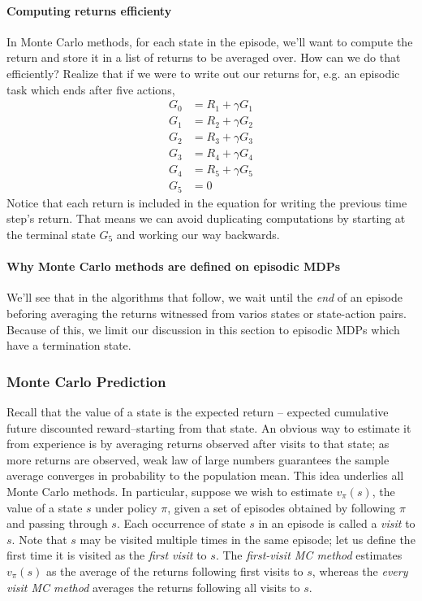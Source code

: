 \documentclass[12pt]{article}
\begin{document}
\paragraph{Computing returns efficienty} In Monte Carlo methods, for each state in the episode, we'll want to compute the return and store it in a list of returns to be averaged over. How can we do that efficiently? Realize that if we were to write out our returns for, e.g. an episodic task which ends after five actions,
\begin{align*}
  G_0 &= R_1 + \gamma G_1 \\
  G_1 &= R_2 + \gamma G_2 \\
  G_2 &= R_3 + \gamma G_3 \\
  G_3 &= R_4 + \gamma G_4 \\
  G_4 &= R_5 + \gamma G_5 \\
  G_5 &= 0
\end{align*}
Notice that each return is included in the equation for writing the previous time step's return. That means we can avoid duplicating computations by starting at the terminal state $G_5$ and working our way backwards.
\paragraph{Why Monte Carlo methods are defined on episodic MDPs}
We'll see that in the algorithms that follow, we wait until the \emph{end} of an episode beforing averaging the returns witnessed from varios states or state-action pairs. Because of this, we limit our discussion in this section to episodic MDPs which have a termination state.

\subsubsection{Monte Carlo Prediction}
Recall that the value of a state is the expected return -- expected cumulative future discounted reward--starting from that state. An obvious way to estimate it from experience is by averaging returns observed after visits to that state; as more returns are observed, weak law of large numbers guarantees the sample average converges in probability to the population mean. This idea underlies all Monte Carlo methods. In particular, suppose we wish to estimate $v_\pi(s)$, the value of a state $s$ under policy $\pi$, given a set of episodes obtained by following $\pi$ and passing through $s$. Each occurrence of state $s$ in an episode is called a \emph{visit} to $s$. Note that $s$ may be visited multiple times in the same episode; let us define the first time it is visited as the \emph{first visit} to $s$. The \emph{first-visit MC method} estimates $v_\pi(s)$ as the average of the returns following first visits to $s$, whereas the \emph{every visit MC method} averages the returns following all visits to $s$.
\end{document}
